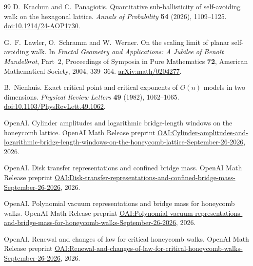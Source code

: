 \documentclass[11pt]{article}
\numberwithin{equation}{section}
\theoremstyle{definition}\newtheorem{definition}[theorem]{Definition}
\theoremstyle{remark}\newtheorem{remark}[theorem]{Remark}
\begin{document}
\begin{thebibliography}{99}
D.~Krachun and C.~Panagiotis.
Quantitative sub-ballisticity of self-avoiding walk on the hexagonal lattice.
\emph{Annals of Probability} \textbf{54} (2026), 1109--1125.
\href{https://doi.org/10.1214/24-AOP1730}{doi:10.1214/24-AOP1730}.

G.~F.~Lawler, O.~Schramm and W.~Werner.
On the scaling limit of planar self-avoiding walk.
In \emph{Fractal Geometry and Applications: A Jubilee of Beno\^it Mandelbrot},
Part~2, Proceedings of Symposia in Pure Mathematics \textbf{72},
American Mathematical Society, 2004, 339--364.
\href{https://arxiv.org/abs/math/0204277}{arXiv:math/0204277}.

B.~Nienhuis.
Exact critical point and critical exponents of $O(n)$ models in two dimensions.
\emph{Physical Review Letters} \textbf{49} (1982), 1062--1065.
\href{https://doi.org/10.1103/PhysRevLett.49.1062}{doi:10.1103/PhysRevLett.49.1062}.

OpenAI.
Cylinder amplitudes and logarithmic bridge-length windows on the honeycomb lattice.
OpenAI Math Release preprint
\href{https://github.com/openai/math/blob/main/preprints/Cylinder-amplitudes-and-logarithmic-bridge-length-windows-on-the-honeycomb-lattice-September-26-2026/main.pdf}{OAI:Cylinder-amplitudes-and-logarithmic-bridge-length-windows-on-the-honeycomb-lattice-September-26-2026},
2026.

OpenAI.
Disk transfer representations and confined bridge mass.
OpenAI Math Release preprint
\href{https://github.com/openai/math/blob/main/preprints/Disk-transfer-representations-and-confined-bridge-mass-September-26-2026/main.pdf}{OAI:Disk-transfer-representations-and-confined-bridge-mass-September-26-2026},
2026.

OpenAI.
Polynomial vacuum representations and bridge mass for honeycomb walks.
OpenAI Math Release preprint
\href{https://github.com/openai/math/blob/main/preprints/Polynomial-vacuum-representations-and-bridge-mass-for-honeycomb-walks-September-26-2026/main.pdf}{OAI:Polynomial-vacuum-representations-and-bridge-mass-for-honeycomb-walks-September-26-2026},
2026.

OpenAI.
Renewal and changes of law for critical honeycomb walks.
OpenAI Math Release preprint
\href{https://github.com/openai/math/blob/main/preprints/Renewal-and-changes-of-law-for-critical-honeycomb-walks-September-26-2026/main.pdf}{OAI:Renewal-and-changes-of-law-for-critical-honeycomb-walks-September-26-2026},
2026.


\end{thebibliography}
\end{document}
